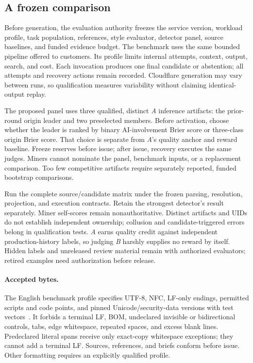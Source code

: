 \subsection{A frozen comparison}\label{common-transformation-evidence}

Before generation, the evaluation authority freezes the service version,
workload profile, task population, references, style evaluator, detector panel,
source baselines, and funded evidence budget. The benchmark uses the same
bounded pipeline offered to customers. Its profile limits internal attempts,
context, output, search, and cost. Each invocation produces one final candidate
or abstention; all attempts and recovery actions remain recorded. Cloudflare
generation may vary between runs, so qualification measures variability without
claiming identical-output replay.

The proposed panel uses three qualified, distinct \textit{A} inference
artifacts: the prior-round origin leader and two preselected members. Before
activation, choose whether the leader is ranked by binary AI-involvement Brier
score or three-class origin Brier score. That choice is separate from
\textit{A}'s quality anchor and reward baseline. Freeze reserves before issue;
after issue, recovery executes the same judges. Miners cannot nominate the
panel, benchmark inputs, or a replacement comparison. Too few competitive
artifacts require separately reported, funded bootstrap comparisons.

Run the complete source/candidate matrix under the frozen parsing, resolution,
projection, and execution contracts. Retain the strongest detector's result
separately. Miner self-scores remain nonauthoritative. Distinct artifacts and
UIDs do not establish independent ownership; collusion and candidate-triggered
errors belong in qualification tests. \textit{A} earns quality credit against
independent production-history labels, so judging \textit{B} harshly supplies
no reward by itself. Hidden labels and unreleased review material remain with
authorized evaluators; retired examples need authorization before release.

\paragraph{Accepted bytes.}\label{canonical-text-profile}
The English benchmark profile specifies UTF-8, NFC, LF-only endings,
permitted scripts and code points, and pinned Unicode/security-data versions
with test vectors~\cite{unicodenormalization,unicodesecurity}. It forbids a
terminal LF, BOM, undeclared invisible or bidirectional controls, tabs, edge
whitespace, repeated spaces, and excess blank lines. Predeclared literal spans
receive only exact-copy whitespace exceptions; they cannot add a terminal LF.
Sources, references, and briefs conform before issue. Other formatting requires
an explicitly qualified profile.

